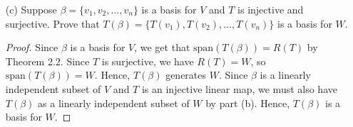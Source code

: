 \begin{enumerate}
\begin{proof}
            (\( \Rightarrow \)) Suppose \( T(S) \) is linearly independent. Then observe that
            \[  \sum_{ i=1 }^{ n } a_{i} T(v_{i}) = 0  \]
        for some scalars \( a_{i}  \) and \( T(v_{i}) \in T(S)  \) for \( 1 \leq i \leq k  \) such that \( a_{i} =0  \). Since \( T  \) is linear and \( T  \) is injective, we can write
        \[  T \Big( \sum_{ i=1 }^{ n } a_{i} v_{i}  \Big) = 0 \iff \sum_{ i=1 }^{ n } a_{i} v_{i} = 0. \]
        Since \( a_{i} = 0  \) and \( v_{i} \in S  \), we also find that \( S  \) is a linearly independent set.
        \end{proof}
    \item[(c)] Suppose \( \beta = \{ v_{1}, v_{2}, \dots, v_{n} \}  \) is a basis for \( V  \) and \( T  \) is injective and surjective. Prove that \( T(\beta) = \{ T(v_{1}), T(v_{2}), \dots, T(v_{n}) \}  \) is a basis for \( W  \). 
        \begin{proof}
            Since \( \beta  \) is a basis for \( V  \), we get that \( \text{span}(T(\beta)) = R(T) \) by Theorem 2.2. Since \( T  \) is surjective, we have \( R(T) = W  \), so \( \text{span}(T(\beta))  = W \). Hence, \( T(\beta) \) generates \( W  \). 
            Since \( \beta \) is a linearly independent subset of \( V  \) and \( T  \) is an injective linear map, we must also have \( T(\beta) \) as a linearly independent subset of \( W \) by part (b).  Hence, \( T(\beta)  \) is a basis for \( W  \).
        \end{proof}
\end{enumerate}

